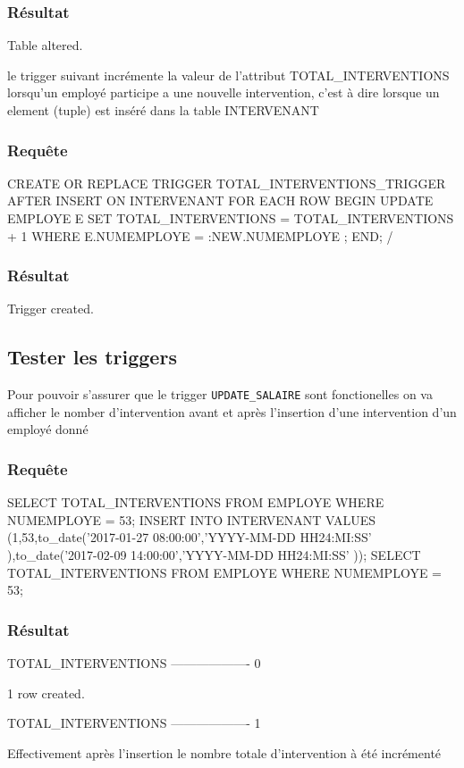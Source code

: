 \documentclass[•]{article}
\begin{document}
\subsubsection{Résultat}
\begin{sql}
Table altered.
\end{sql}

le trigger suivant incrémente la valeur de l'attribut TOTAL_INTERVENTIONS lorsqu'un employé participe a une nouvelle intervention,
c'est à dire lorsque un element (tuple) est inséré dans la table INTERVENANT

\subsubsection{Requête}
\begin{sql}
CREATE OR REPLACE TRIGGER TOTAL_INTERVENTIONS_TRIGGER
AFTER INSERT ON INTERVENANT
FOR EACH ROW
BEGIN
	UPDATE EMPLOYE E
	SET TOTAL_INTERVENTIONS = TOTAL_INTERVENTIONS + 1 
	WHERE E.NUMEMPLOYE = :NEW.NUMEMPLOYE ;
END;
/
\end{sql}

\subsubsection{Résultat}
\begin{sql}
Trigger created.
\end{sql}

\subsection{Tester les triggers}
Pour pouvoir s'assurer que le trigger \texttt{UPDATE_SALAIRE} sont fonctionelles on va afficher le nomber d'intervention avant et après l'insertion d'une intervention d'un employé donné


\subsubsection{Requête}
\begin{sql}
SELECT TOTAL_INTERVENTIONS FROM EMPLOYE WHERE NUMEMPLOYE = 53;
INSERT INTO INTERVENANT VALUES (1,53,to_date('2017-01-27 08:00:00','YYYY-MM-DD HH24:MI:SS' ),to_date('2017-02-09 14:00:00','YYYY-MM-DD HH24:MI:SS' ));
SELECT TOTAL_INTERVENTIONS FROM EMPLOYE WHERE NUMEMPLOYE = 53;
\end{sql}

\subsubsection{Résultat}
\begin{sql}
TOTAL_INTERVENTIONS
-------------------
                  0

1 row created.

TOTAL_INTERVENTIONS
-------------------
                  1
\end{sql}

Effectivement après l'insertion le nombre totale d'intervention à été incrémenté
\end{document}
